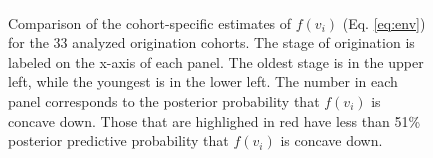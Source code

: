 \documentclass[12pt,letterpaper]{article}
\begin{document}
\begin{figure}
  \centering
  \includegraphics[height = 0.5\textheight,width=\textwidth,keepaspectratio=true]{figure/cohort_quads}
  \caption{Comparison of the cohort-specific estimates of \(f(v_{i})\) (Eq. \ref{eq:env}) for the 33 analyzed origination cohorts. The stage of origination is labeled on the x-axis of each panel. The oldest stage is in the upper left, while the youngest is in the lower left. The number in each panel corresponds to the posterior probability that \(f(v_{i})\) is concave down. Those that are highlighed in red have less than 51\% posterior predictive probability that \(f(v_{i})\) is concave down.}
  \label{fig:env_cohort}
\end{figure}
\end{document}
